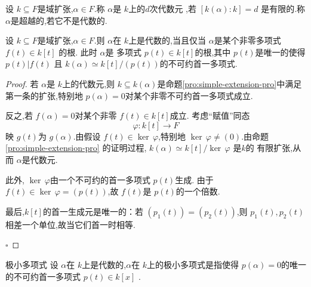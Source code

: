 \documentclass[lang=cn,12pt,color=green,fontset=none,pad]{elegantbook}
\begin{document}
\begin{definition}
    设 \(  k\subseteq F  \)是域扩张,\(   \alpha  \in F  \).称 \(  \alpha   \)是 \(  k  \)上的\(  d  \)次代数元 ,若 \(  [k\left(  \alpha  \right): k ]=d  \)     是有限的.称 \(  \alpha   \)是超越的,若它不是代数的. 
\end{definition}

\begin{lemma}\label{lem:min-poly-lem}
    设 \(  k\subseteq F  \)是域扩张,\(  \alpha \in F  \).则 \(  \alpha   \)在 \(  k  \)上是代数的,当且仅当 \(  \alpha   \)是某个非零多项式 \(  f\left( t \right) \in k[t]   \)      的根.
    此时 \(  \alpha   \)是 多项式 \(  p\left( t \right)\in k[t]   \)的根,其中 \(  p\left( t \right)   \)是唯一的使得 \(  p\left( t \right)|f\left( t \right)    \)    且 \(  k\left(  \alpha  \right)\simeq  k[t]/ \left( p\left( t \right)  \right)    \)的不可约首一多项式. 
\end{lemma}

\begin{proof}
    若 \(  \alpha  \)是 \(  k  \)上的代数元,则 \(  k\subseteq k\left( \alpha \right)   \)是命题\ref{pro:simple-extension-pro}中满足第一条的扩张,特别地 \(  p\left( \alpha \right)=0   \)对某个非零不可约首一多项式成立.
    
    反之,若 \(  f\left( \alpha \right)=0   \)对某个非零 \(  f\left( t \right)\in k[t]   \)成立.
    考虑“赋值”同态 \[
    \varphi:k[t]\to F
    \]映 \(  g\left( t \right)   \)为 \(  g\left( \alpha \right)   \).由假设 \(  f\left( t \right)\in \operatorname{ker}\,\varphi   \),特别地 \(  \operatorname{ker}\,\varphi\neq \left( 0 \right)   \).由命题\ref{pro:simple-extension-pro} 的证明过程, \(  k\left( \alpha \right)\simeq k[t]/\operatorname{ker}\,\varphi   \)   是\(  k  \)的 有限扩张,从而 \(  \alpha  \)是代数元. 
    
    此外, \(  \operatorname{ker}\,\varphi  \)由一个不可约的首一多项式 \(  p\left( t \right)   \)生成.
    由于 \(  f\left( t \right)\in \operatorname{ker}\,\varphi=\left( p\left( t \right)  \right)    \),故 \(  f\left( t \right)   \)是 \(  p\left( t \right)   \)的一个倍数.
    
    最后,\(  k[t]  \)的首一生成元是唯一的：若 \(  \left( p_1\left( t \right)  \right)=\left( p_2\left( t \right)  \right)    \),则 \(  p_1\left( t \right),p_2\left( t \right)    \)相差一个单位,故当它们首一时相等.        

    \hfill $\square$
\end{proof}

\begin{definition}{极小多项式}
    设 \(  \alpha   \)在 \(  k  \)上是代数的,\(  \alpha   \)在 \(  k  \)上的极小多项式是指使得 \(  p\left(  \alpha  \right)=0   \)的唯一的不可约首一多项式 \(  p\left( t \right)\in k[x]   \)  .
        
\end{definition}
\end{document}
